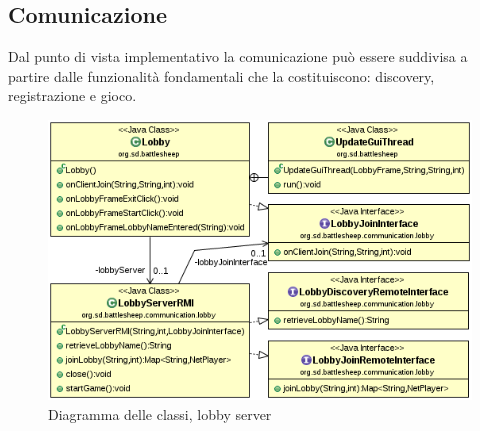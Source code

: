 
\subsection{Comunicazione}
Dal punto di vista implementativo la comunicazione può essere suddivisa a 
partire dalle funzionalità fondamentali che la costituiscono: discovery, registrazione e gioco.

\begin{figure}[!ht]
    \centering
    \includegraphics[scale=0.55,center]{core/imgs/UML/LobbyCommunicationUML-noattr.png}
    \caption{Diagramma delle classi, lobby server}
    \label{fig:classlobby}
\end{figure}

